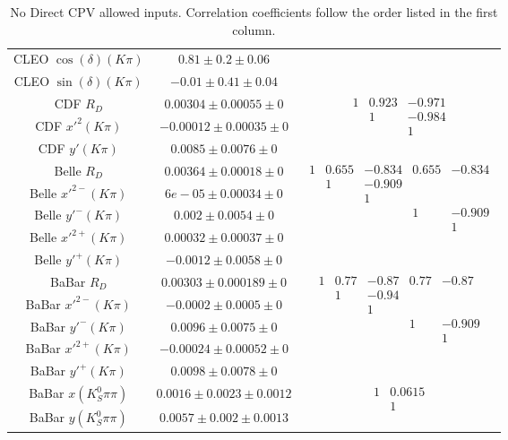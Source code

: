\begin{table}[htdp]
\begin{center}
\begin{tabular}{|c|c|c|}
CLEO $\cos(\delta)(K\pi)$ & $0.81\pm0.2\pm0.06$ & \\
CLEO $\sin(\delta)(K\pi)$ & $-0.01\pm0.41\pm0.04$ & \\
\hline
CDF $ R_D$ & $0.00304\pm0.00055\pm0$ &\multirow{3}{*}{$\begin{array}{ccc}1 & 0.923 & -0.971 \\ & 1 & -0.984 \\ & & 1 \end{array}$}\\
CDF $ x'^2(K\pi)$ & $-0.00012\pm0.00035\pm0$ & \\
CDF $y'(K\pi)$ & $0.0085\pm0.0076\pm0$ & \\
\hline
Belle $ R_D$ & $0.00364\pm0.00018\pm0$ &\multirow{5}{*}{$\begin{array}{ccccc} 
1 & 0.655& -0.834& 0.655& -0.834\\
 & 1 & -0.909 & & \\
 & & 1 & & \\
 & & & 1& -0.909 \\
& & & & 1
\end{array}$} \\
Belle $ x'^{2-}(K\pi)$ & $6e-05\pm0.00034\pm0$ & \\
Belle $y'^-(K\pi)$ & $0.002\pm0.0054\pm0$ & \\
Belle $ x'^{2+}(K\pi)$ & $0.00032\pm0.00037\pm0$ & \\
Belle $y'^+(K\pi)$ & $-0.0012\pm0.0058\pm0$ & \\
\hline
BaBar $ R_D$ & $0.00303\pm0.000189\pm0$ &\multirow{5}{*}{$\begin{array}{ccccc}
1 & 0.77 & -0.87 & 0.77 & -0.87 \\
 & 1 &-0.94 &  &  \\
   & & 1 & & \\
 & & & 1 &-0.909 \\
& & & & 1
 \end{array}$} \\
BaBar $ x'^{2-}(K\pi)$ & $-0.0002\pm0.0005\pm0$ & \\
BaBar $y'^-(K\pi)$ & $0.0096\pm0.0075\pm0$ & \\
BaBar $ x'^{2+}(K\pi)$ & $-0.00024\pm0.00052\pm0$ & \\
BaBar $y'^+(K\pi)$ & $0.0098\pm0.0078\pm0$ & \\
\hline
BaBar $x(K_S^0\pi\pi)$ & $0.0016\pm0.0023\pm0.0012$ & \multirow{2}{*}{$\begin{array}{cc} 1 & 0.0615 \\ & 1\end{array}$}\\
BaBar $y(K_S^0\pi\pi)$ & $0.0057\pm0.002\pm0.0013$ & \\
\hline
\end{tabular}
\end{center}
\caption{No Direct CPV allowed inputs. Correlation coefficients follow the order listed
in the first column.}
\label{table:nodcpv_inputs}
\end{table}
